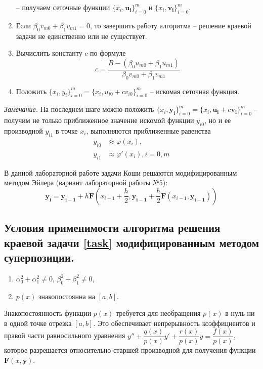 \documentclass[a4paper, 12pt]{article}
\begin{document}
\begin{enumerate}
		-- получаем сеточные функции $\{x_i,\mathbf{u_i}\}_{i=0}^m$ и $\{x_i,\mathbf{v_i}\}_{i=0}^m$.
		\item \label{algerr} Если $\beta_0v_{m0}+\beta_1v_{m1}=0$, то завершить работу алгоритма -- решение краевой задачи не единственно или не существует.
		\item Вычислить константу $c$ по формуле
		\begin{equation} \label{const}
			c=\dfrac{B-(\beta_0u_{m0}+\beta_1u_{m1})}{\beta_0v_{m0}+\beta_1v_{m1}}
		\end{equation}
		\item Положить $\{x_i,y_i\}_{i=0}^m = \{x_i,u_{i0}+cv_{i0}\}_{i=0}^m$ -- искомая сеточная функция.
	\end{enumerate}
	
	\textit{Замечание.} На последнем шаге можно положить $\{x_i,\mathbf{y_i}\}_{i=0}^m = \{x_i,\mathbf{u_i}+c\mathbf{v_i}\}_{i=0}^m$ -- получим не только приближенное значение искомой функции $y_{i0}$, но и ее производной $y_{i1}$ в точке $x_i$, выполняются приближенные равенства
	\begin{equation}
		\begin{aligned}
			y_{i0} &\approx \varphi(x_i),\\
			y_{i1} &\approx \varphi'(x_i), i=\overline{0,m}
		\end{aligned}
	\end{equation} 

	В данной лабораторной работе задачи Коши решаются модифицированным методом Эйлера (вариант лабораторной работы №5):
	\begin{equation} \label{modeuler}
		\mathbf{y_i} = \mathbf{y_{i-1}} + h\mathbf{F}(x_{i-1} + \frac{h}{2}, \mathbf{y_{i-1}}+\frac{h}{2}\mathbf{F}(x_{i-1},\mathbf{y_{i-1}}))
	\end{equation}
	
	\subsection{Условия применимости алгоритма решения краевой задачи \eqref{task} модифицированным методом суперпозиции.}
	
	\begin{enumerate}
		\item $\alpha_0^2+\alpha_1^2\neq0$, $\beta_0^2+\beta_1^2\neq0$,
		\item $p(x)$ знакопостоянна на $[a,b]$.
	\end{enumerate}

	Знакопостоянность функции $p(x)$ требуется для необращения $p(x)$ в нуль ни в одной точке отрезка $[a,b]$. Это обеспечивает непрерывность коэффициентов и правой части равносильного уравнения $y''+\dfrac{q(x)}{p(x)}y'+\dfrac{r(x)}{p(x)}y=\dfrac{f(x)}{p(x)}$, которое разрешается относительно старшей производной для получения функции $\mathbf{F}(x, \mathbf{y})$.
	
\end{document}

